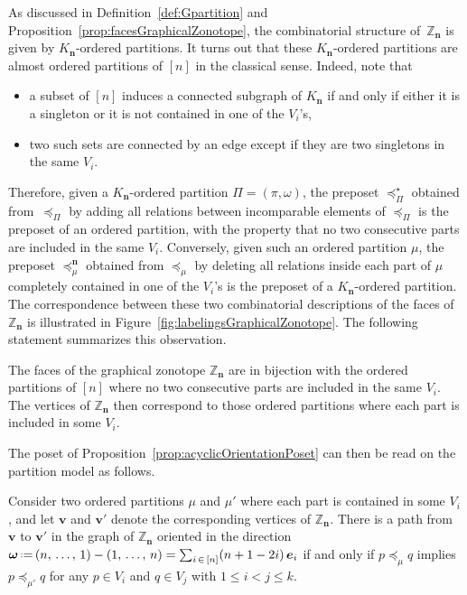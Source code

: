 \documentclass[AHL,Unicode,longabstracts,published]{cedram}
\renewcommand{\b}[1]{\boldsymbol{#1}}
\newcommand{\eqdef}{\mbox{\,\raisebox{0.2ex}{\scriptsize\ensuremath{\mathrm:}}\ensuremath{=}\,}}
\newcommand{\polytope}[1]{\mathds{#1}}
\begin{document}
As discussed in Definition~\ref{def:Gpartition} and Proposition~\ref{prop:facesGraphicalZonotope}, the combinatorial structure of~$\polytope{Z}_{\b{n}}$ is given by $K_{\b{n}}$-ordered partitions. It turns out that these $K_{\b{n}}$-ordered partitions are almost ordered partitions of $[n]$ in the classical sense. Indeed, note that
\begin{itemize}
\item a subset of $[n]$ induces a connected subgraph of $K_{\b{n}}$ if and only if either it is a singleton or it is not contained in one of the $V_i$'s,
\item two such sets are connected by an edge except if they are two singletons in the same $V_i$.
\end{itemize}
Therefore, given a $K_{\b{n}}$-ordered partition $\Pi = (\pi,\omega)$, the preposet $\preccurlyeq_\Pi^\star$ obtained from~$\preccurlyeq_\Pi$ by adding all relations between incomparable elements of $\preccurlyeq_\Pi$ is the preposet of an ordered partition, with the property that no two consecutive parts are included in the same $V_i$. Conversely, given such an ordered partition $\mu$, the preposet $\preccurlyeq_\mu^{\b{n}}$ obtained from $\preccurlyeq_\mu$ by deleting all relations inside each part of $\mu$ completely contained in one of the $V_i$'s is the preposet of a $K_{\b{n}}$-ordered partition. The correspondence between these two combinatorial descriptions of the faces of $\polytope{Z}_{\b{n}}$ is illustrated in Figure~\ref{fig:labelingsGraphicalZonotope}. The following statement summarizes this observation.

\begin{prop}\label{prop:completeMultipartiteGraphicalZonotopeFaces}
The faces of the graphical zonotope $\polytope{Z}_{\b{n}}$ are in bijection with the ordered partitions of $[n]$ where no two consecutive parts are included in the same $V_i$. The vertices of $\polytope{Z}_{\b{n}}$ then correspond to those ordered partitions where each part is included in some $V_i$.
\end{prop}

The poset of Proposition~\ref{prop:acyclicOrientationPoset} can then be read on the partition model as follows.

\begin{prop}\label{prop:completeMultipartiteGraphicalZonotopeRotationPosets}
Consider two ordered partitions $\mu$ and $\mu'$ where each part is contained in some $V_i$, and let $\b{v}$ and $\b{v}'$ denote the corresponding vertices of $\polytope{Z}_{\b{n}}$. There is a path from $\b{v}$ to $\b{v}'$ in the graph of $\polytope{Z}_{\b{n}}$ oriented in the direction~${\b{\omega} \eqdef (n,\,\dots,\,1) - (1,\,\dots,\,n) = \sum_{i\,\in\,[n]} (n+1-2i) \, \b{e}_i}$ if and only if $p \preccurlyeq_\mu q$ implies~$p \preccurlyeq_{\mu'} q$ for any $p \in V_i$ and $q \in V_j$ with $1 \le i < j \le k$.
\end{prop}
\end{document}
